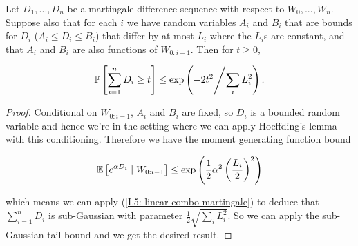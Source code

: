 \documentclass[11pt]{scrartcl}
\begin{document}
\begin{theorem}
Let $D_1, ... , D_n$ be a martingale difference sequence with respect to $W_0, ... , W_n$. Suppose also that for each $i$ we have random variables $A_i$ and $B_i$ that are bounds for $D_i$ ($A_i \le D_i \le B_i$) that differ by at most $L_i$ where the $L_i$s are constant, and that $A_i$ and $B_i$ are also functions of $W_{0:i-1}$. Then for $t\ge0$,

\begin{equation}
    \P{\sum_{i=1}^n D_i \ge t} \le \exp{-2t^2 \middle/ \sum_i L_i^2}.
\end{equation}

\begin{proof}
Conditional on $W_{0:i-1}$, $A_i$ and $B_i$ are fixed, so $D_i$ is a bounded random variable and hence we're in the setting where we can apply Hoeffding's lemma with this conditioning. Therefore we have the moment generating function bound

\begin{equation}
    \E{e^{\alpha D_i} \mid W_{0:i-1}} \le \exp{\frac12 \alpha^2 \left( \frac{L_i}{2} \right)^2}
\end{equation}

which means we can apply (\ref{L5: linear combo martingale}) to deduce that $\sum_{i=1}^n D_i$ is sub-Gaussian with parameter $\frac12 \sqrt{\sum_i L_i^2}$. So we can apply the sub-Gaussian tail bound and we get the desired result. %


\end{proof}
\end{theorem}
\end{document}
